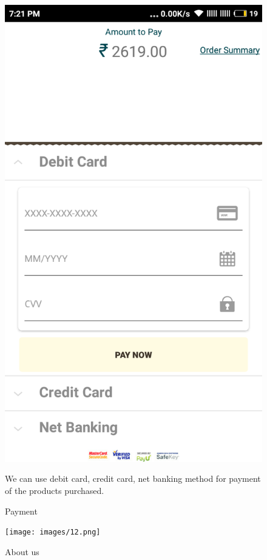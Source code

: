 \begin{figure}[ht]
\centering
\includegraphics[scale=0.30]{images/cardcheckout.png}
\caption{Payment}

We can use debit card, credit card, net banking method for payment of the products purchased.

\end{figure}

\newpage

\begin{figure}[ht]
\centering
\texttt{[image: images/12.png]}
\caption{About us}
\end{figure}

